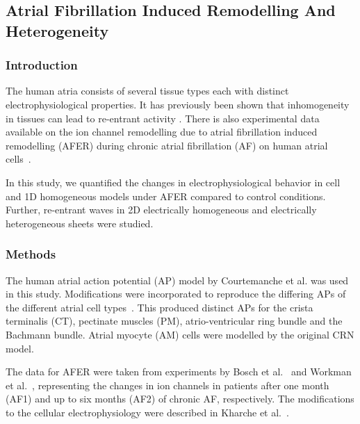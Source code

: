 \subsection{Atrial Fibrillation Induced Remodelling And Heterogeneity}

\subsubsection{Introduction}

The human atria consists of several tissue types each with distinct
electrophysiological properties.  It has previously been shown that
inhomogeneity in tissues can lead to re-entrant activity
\cite{Bernus2005, Coronel1992, Kumagai1997}.  There is also experimental
data available on the ion channel remodelling due to atrial
fibrillation induced remodelling (AFER) during chronic atrial
fibrillation (AF) on human atrial cells~\cite{Bosch1999,Workman2001}.

In this study, we quantified the changes in electrophysiological
behavior in cell and 1D homogeneous models under AFER compared to control
conditions.  Further, re-entrant waves in 2D electrically homogeneous
and electrically heterogeneous sheets were studied.

\subsubsection{Methods}

The human atrial action potential (AP) model by Courtemanche et
al.\cite{CRN98} was used in this study.  Modifications were
incorporated to reproduce the differing APs of the different atrial cell
types~\cite{Seemann2006}.  This produced distinct APs for the
crista terminalis (CT), pectinate muscles (PM), atrio-ventricular ring
bundle and the Bachmann bundle.  Atrial myocyte (AM) cells were modelled
by the original CRN model.

The data for AFER were taken from experiments by Bosch et
al.~\cite{Bosch1999} and Workman et al.~\cite{Workman2001}, representing
the changes in ion channels in patients after one month (AF1)
and up to six months (AF2) of chronic AF, respectively.  The
modifications to the cellular electrophysiology were described in
Kharche et al.~\cite{Kharche2007}.

